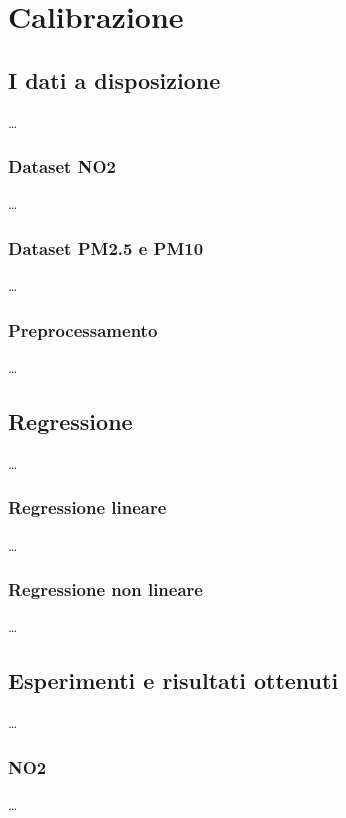 \chapter{Calibrazione}\label{ch:calibrazione}

\section{I dati a disposizione}\label{sec:dati}
\ldots

\subsection{Dataset NO2}\label{ssec:dataset-no2}
\ldots

\subsection{Dataset PM2.5 e PM10}\label{ssec:dataset-pm}
\ldots

\subsection{Preprocessamento}\label{ssec:preprocessamento}
\ldots

\section{Regressione}\label{sec:regressione}
\ldots

\subsection{Regressione lineare}\label{ssec:regressione-lineare}
\ldots

\subsection{Regressione non lineare}\label{ssec:regressione-non-lineare}
\ldots

\section{Esperimenti e risultati ottenuti}\label{sec:esperimenti}
\ldots

\subsection{NO2}\label{ssec:risultati-no2}
\ldots

